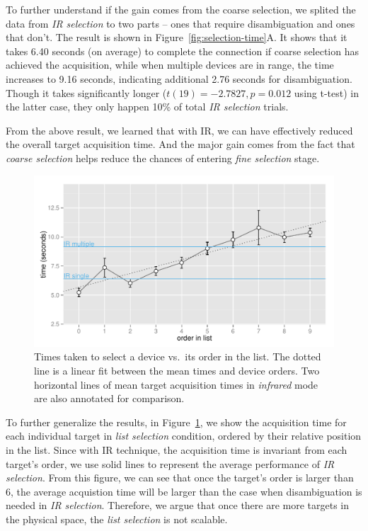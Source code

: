 To further understand if the gain comes from the coarse selection, we splited the data from {\em IR selection} to two parts -- ones that require disambiguation and ones that don't. The result is shown in Figure~\ref{fig:selection-time}A. It shows that it takes 6.40 seconds (on average) to complete the connection if coarse selection has achieved the acquisition, while when multiple devices are in range, the time increases to 9.16 seconds, indicating additional 2.76 seconds for disambiguation. Though it takes significantly longer ($t(19)=-2.7827, p=0.012$ using t-test) in the latter case, they only happen 10\% of total {\em IR selection} trials.

From the above result, we learned that with IR, we can have effectively reduced the overall target acquisition time. And the major gain comes from the fact that {\em coarse selection} helps reduce the chances of entering {\em fine selection} stage. 

\begin{figure}[t]
\centering
\includegraphics[width=1.0\columnwidth]{figures/R_List_by_Target.pdf}
\caption{Times taken to select a device vs.~its order in the list. The dotted line is a linear fit between the mean times and device orders. Two horizontal lines of mean target acquisition times in {\em infrared} mode are also annotated for comparison.}
\label{fig:time-vs-list-order}
\end{figure}

To further generalize the results, in Figure~\ref{fig:time-vs-list-order}, we show the acquisition time for each individual target in {\em list selection} condition, ordered by their relative position in the list. Since with IR technique, the acquisition time is invariant from each target's order, we use solid lines to represent the average performance of {\em IR selection}. From this figure, we can see that once the target's order is larger than 6, the average acquistion time will be larger than the case when disambiguation is needed in {\em IR selection}. Therefore, we argue that once there are more targets in the physical space, the {\em list selection} is not scalable.

